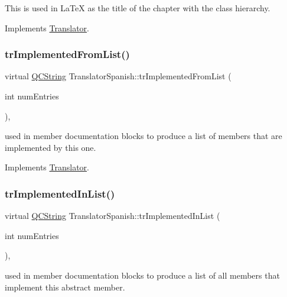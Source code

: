 This is used in La\+TeX as the title of the chapter with the class hierarchy. 

Implements \mbox{\hyperlink{class_translator}{Translator}}.

\mbox{\label{class_translator_spanish_af729de0f74371298a658f1e369c9243a}} 
\subsubsection{\texorpdfstring{trImplementedFromList()}{trImplementedFromList()}}
{\footnotesize\ttfamily virtual \mbox{\hyperlink{class_q_c_string}{Q\+C\+String}} Translator\+Spanish\+::tr\+Implemented\+From\+List (\begin{DoxyParamCaption}\item[{int}]{num\+Entries }\end{DoxyParamCaption})\hspace{0.3cm}{\ttfamily [inline]}, {\ttfamily [virtual]}}

used in member documentation blocks to produce a list of members that are implemented by this one. 

Implements \mbox{\hyperlink{class_translator}{Translator}}.

\mbox{\label{class_translator_spanish_ab397a2f53e5e7c9586996cdc41a399d6}} 
\subsubsection{\texorpdfstring{trImplementedInList()}{trImplementedInList()}}
{\footnotesize\ttfamily virtual \mbox{\hyperlink{class_q_c_string}{Q\+C\+String}} Translator\+Spanish\+::tr\+Implemented\+In\+List (\begin{DoxyParamCaption}\item[{int}]{num\+Entries }\end{DoxyParamCaption})\hspace{0.3cm}{\ttfamily [inline]}, {\ttfamily [virtual]}}

used in member documentation blocks to produce a list of all members that implement this abstract member. 

